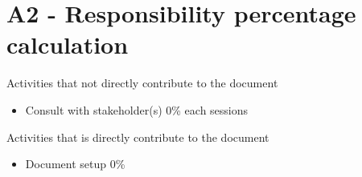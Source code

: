 \documentclass[ 10pt]{report}
\begin{document}
        \section{A2 - Responsibility percentage calculation}

        Activities that not directly contribute to the document
        \begin{itemize}
            \item Consult with stakeholder(s) 0\% each sessions
        \end{itemize}
        \indent\indent Activities that is directly contribute to the document
        \begin{itemize}
            \item Document setup 0\%
        \end{itemize}
\end{document}
